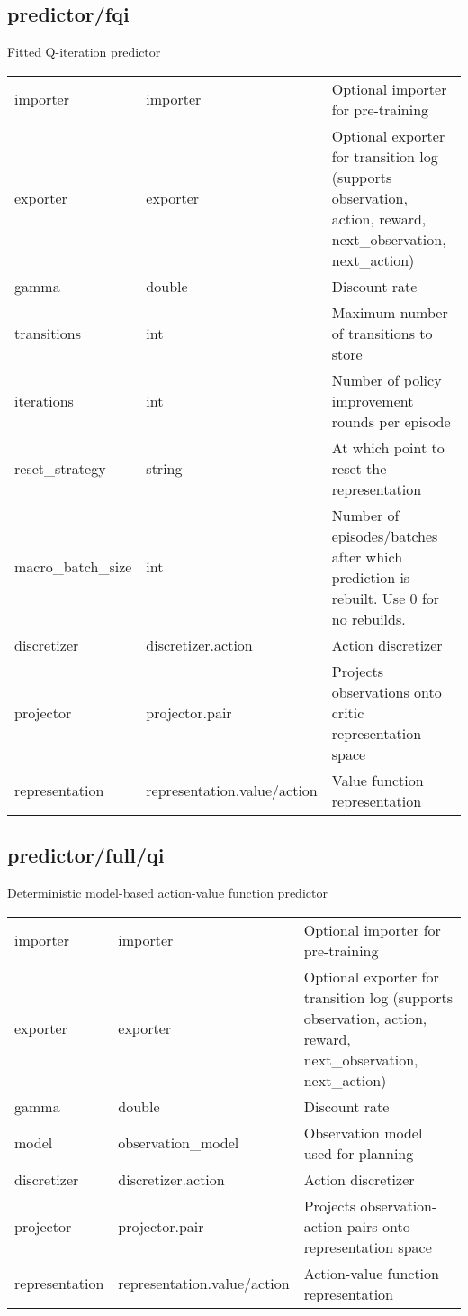 \subsection{predictor/fqi}
\noindent Fitted Q-iteration predictor\\

\noindent\begin{tabular}{@{}lll@{}}
importer&importer&Optional importer for pre-training\\
exporter&exporter&Optional exporter for transition log (supports observation, action, reward, next\_observation, next\_action)\\
gamma&double&Discount rate\\
transitions&int&Maximum number of transitions to store\\
iterations&int&Number of policy improvement rounds per episode\\
reset\_strategy&string&At which point to reset the representation\\
macro\_batch\_size&int&Number of episodes/batches after which prediction is rebuilt. Use 0 for no rebuilds.\\
discretizer&discretizer.action&Action discretizer\\
projector&projector.pair&Projects observations onto critic representation space\\
representation&representation.value/action&Value function representation\\
\end{tabular}
\subsection{predictor/full/qi}
\noindent Deterministic model-based action-value function predictor\\

\noindent\begin{tabular}{@{}lll@{}}
importer&importer&Optional importer for pre-training\\
exporter&exporter&Optional exporter for transition log (supports observation, action, reward, next\_observation, next\_action)\\
gamma&double&Discount rate\\
model&observation\_model&Observation model used for planning\\
discretizer&discretizer.action&Action discretizer\\
projector&projector.pair&Projects observation-action pairs onto representation space\\
representation&representation.value/action&Action-value function representation\\
\end{tabular}
